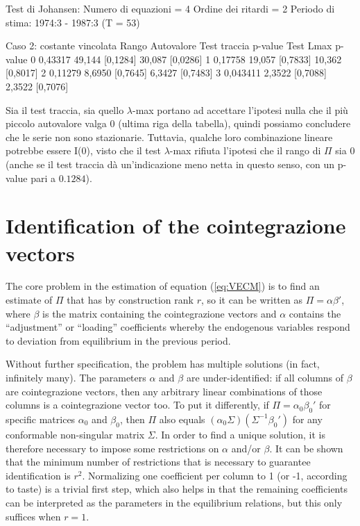 \begin{center}
\begin{code}
Test di Johansen:
Numero di equazioni = 4
Ordine dei ritardi = 2
Periodo di stima: 1974:3 - 1987:3 (T = 53)

Caso 2: costante vincolata
Rango Autovalore Test traccia p-value   Test Lmax  p-value
   0    0,43317     49,144 [0,1284]     30,087 [0,0286]
   1    0,17758     19,057 [0,7833]     10,362 [0,8017]
   2    0,11279     8,6950 [0,7645]     6,3427 [0,7483]
   3   0,043411     2,3522 [0,7088]     2,3522 [0,7076]
\end{code}
\end{center}

Sia il test traccia, sia quello $\lambda$-max portano ad accettare l'ipotesi nulla
che il più piccolo autovalore valga 0 (ultima riga della tabella), quindi possiamo
concludere che le serie non sono stazionarie. Tuttavia, qualche loro combinazione
lineare potrebbe essere I(0), visto che il test $\lambda$-max rifiuta l'ipotesi che
il rango di $\Pi$ sia 0 (anche se il test traccia dà un'indicazione meno netta
in questo senso, con un p-value pari a $0.1284$).

\section{Identification of the cointegrazione vectors}
\label{sec:johansen-ident}

The core problem in the estimation of equation (\ref{eq:VECM}) is to
find an estimate of $\Pi$ that has by construction rank $r$, so it can
be written as $\Pi = \alpha \beta'$, where $\beta$ is the matrix
containing the cointegrazione vectors and $\alpha$ contains the
``adjustment'' or ``loading'' coefficients whereby the endogenous
variables respond to deviation from equilibrium in the previous period.

Without further specification, the problem has multiple solutions (in
fact, infinitely many). The parameters $\alpha$ and $\beta$ are
under-identified: if all columns of $\beta$ are cointegrazione vectors,
then any arbitrary linear combinations of those columns is a
cointegrazione vector too.  To put it differently, if $\Pi = \alpha_0
\beta_0'$ for specific matrices $\alpha_0$ and $\beta_0$, then $\Pi$
also equals $(\alpha_0 \Sigma)(\Sigma^{-1} \beta_0')$ for any conformable
non-singular matrix $\Sigma$.  In order to find a unique solution, it
is therefore necessary to impose some restrictions on $\alpha$ and/or
$\beta$. It can be shown that the minimum number of restrictions that
is necessary to guarantee identification is $r^2$. Normalizing one
coefficient per column to 1 (or -1, according to taste) is a trivial first
step, which also helps in that the remaining coefficients can be
interpreted as the parameters in the equilibrium relations, but this
only suffices when $r=1$.

